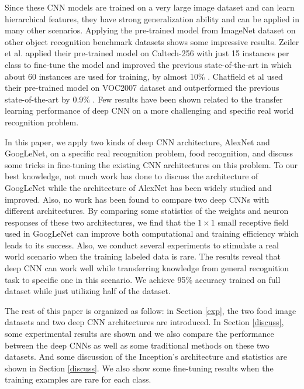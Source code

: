 Since these CNN models are trained on a very large image dataset and can learn hierarchical features, they have strong generalization ability and can be applied in many other scenarios. Applying the pre-trained model from ImageNet dataset on other object recognition benchmark datasets shows some impressive results.
Zeiler et al. applied their pre-trained model on Caltech-256 with just 15 instances per class to fine-tune the model and improved the previous state-of-the-art in which about 60 instances are used for training, by almost 10\% \cite{zeiler2014visualizing}.
Chatfield et al used their pre-trained model on VOC2007 dataset and outperformed the previous state-of-the-art by 0.9\% \cite{Chatfield14}.
Few results have been shown related to the transfer learning performance of deep CNN on a more challenging and specific real world recognition problem.

In this paper, we apply two kinds of deep CNN architecture, AlexNet and GoogLeNet, on a specific real recognition problem, food recognition, and discuss some tricks in fine-tuning the existing CNN architectures on this problem. To our best knowledge, not much work has done to discuss the architecture of GoogLeNet while the architecture of AlexNet has been widely studied and improved. Also, no work has been found to compare two deep CNNs with different architectures. By comparing some statistics of the weights and neuron responses of these two architectures, we find that the $1\times 1$ small receptive field used in GoogLeNet can improve both computational and training efficiency which leads to its success.
Also, we conduct several experiments to stimulate a real world scenario when the training labeled data is rare. The results reveal that deep CNN can work well while transferring knowledge from general recognition task to specific one in this scenario. We achieve 95\% accuracy trained on full dataset while just utilizing half of the dataset.

The rest of this paper is organized as follow: in Section \ref{exp}, the two food image datasets and two deep CNN architectures are introduced. In Section \ref{discuss}, some experimental results are shown and we also compare the performance between the deep CNNs as well as some traditional methods on these two datasets. And some discussion of the Inception's architecture and statistics are shown in Section \ref{discuss}. We also show some fine-tuning results when the training examples are rare for each class.
